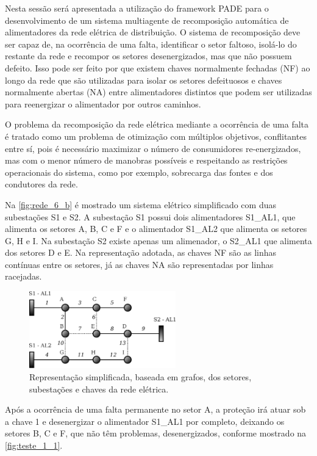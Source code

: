 \documentclass[journal]{IEEEtran}
\begin{document}
Nesta sessão será apresentada a utilização do framework PADE para o desenvolvimento de um sistema multiagente de recomposição automática de alimentadores da rede elétrica de distribuição. O sistema de recomposição deve ser capaz de, na ocorrência de uma falta, identificar o setor faltoso, isolá-lo do restante da rede e recompor os setores desenergizados, mas que não possuem defeito. Isso pode ser feito por que existem chaves normalmente fechadas (NF) ao longo da rede que são utilizadas para isolar os setores defeituosos e chaves normalmente abertas (NA) entre alimentadores distintos que podem ser utilizadas para reenergizar o alimentador por outros caminhos.

O problema da recomposição da rede elétrica mediante a ocorrência de uma falta é tratado como um problema de otimização com múltiplos objetivos, conflitantes entre sí, pois é necessário maximizar o número de consumidores re-energizados, mas com o menor número de manobras possíveis e respeitando as restrições operacionais do sistema, como por exemplo, sobrecarga das fontes e dos condutores da rede.

Na \autoref{fig:rede_6_b} é mostrado um sistema elétrico simplificado com duas subestações S1 e S2. A subestação S1 possui dois alimentadores S1\_AL1, que alimenta os setores A, B, C e F e o alimentador S1\_AL2 que alimenta os setores G, H e I. Na subestação S2 existe apenas um alimenador, o S2\_AL1 que alimenta dos setores D e E. Na representação adotada, as chaves NF são as linhas contínuas entre os setores, já as chaves NA são representadas por linhas racejadas.

\begin{figure}[htb]
    \centering
    
    \includegraphics[width=2.5in]{Figuras/rede_estado_normal.eps}

    \caption{\label{fig:rede_6_b} Representação simplificada, baseada em grafos, dos setores, subestações e chaves da rede elétrica.}
\end{figure}

Após a ocorrência de uma falta permanente no setor A, a proteção irá atuar sob a chave 1 e desenergizar o alimentador S1\_AL1 por completo, deixando os setores B, C e F, que não têm problemas, desenergizados, conforme mostrado na \autoref{fig:teste_1_1}.
\end{document}
